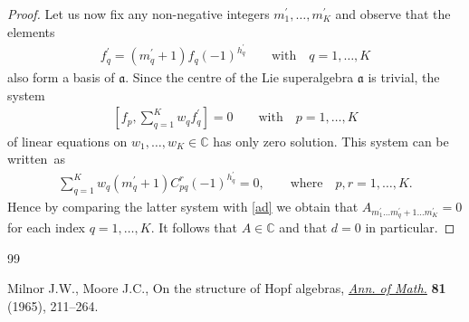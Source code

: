 \documentclass[10pt,a4paper]{amsart}
\numberwithin{equation}{section}
\def\a{\mathfrak{a}}
\def\CC{{\mathbb{C}}}
\begin{document}
\begin{proof}
Let us now fix any non-negative integers
$m_1^{\prime},\dots,m_K^{\prime}$
and observe that the elements
\begin{gather*}
f_q^{\prime}=(m_q^{\prime}+1) f_q
 (-1)^{h_{q}^{\prime}}
\qquad\text{with}\quad q=1,\dots, K
\end{gather*}
also form a basis of $\a $. Since the centre of
the Lie superalgebra $\a$ is trivial, the system
\begin{gather*}
\left[ f_p , \sum_{q=1}^K w_{q} f_q^{\prime} \right]=0
\qquad\text{with}\quad
p=1,\dots, K
\end{gather*}
of linear equations on $w_{1},\dots, w_{K}\in\CC$
has only zero solution. This system can be written~as
\begin{gather*}
\sum_{q=1}^K w_{q}
(m^{\prime}_q+1) C_{pq}^{r} (-1)^{h_{q}^{\prime}}=0,
\qquad\text{where}\quad
p ,r=1,\dots, K .
\end{gather*}
Hence by comparing the latter system with \eqref{ad} we obtain that
$A_{m_1^{\prime}\dots m^{\prime}_q+1\dots m^{\prime}_K}=0$
for each index $q=1,\dots, K $. It follows that $A\in\CC$
and that $d=0$ in particular.
\end{proof}

\begin{thebibliography}{99}

Milnor J.W., Moore J.C., On the structure of {H}opf algebras, \href{https://doi.org/10.2307/1970615}{\textit{Ann. of
 Math.}} \textbf{81} (1965), 211--264.

\end{thebibliography}
\end{document}
